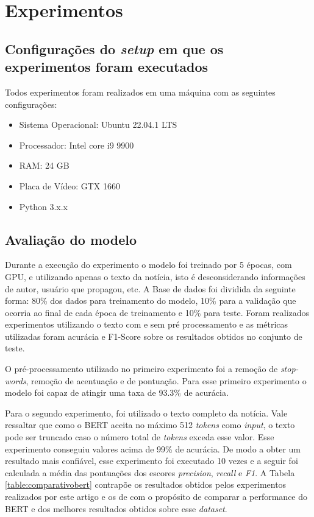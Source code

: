 \section{Experimentos}


\subsection{Configurações do \textit{setup} em que os experimentos foram executados}

Todos experimentos foram realizados em uma máquina com as seguintes configurações: 

\begin{itemize}
    \item Sistema Operacional: Ubuntu 22.04.1 LTS
    \item Processador: Intel core i9 9900
    \item RAM: 24 GB
    \item Placa de Vídeo: GTX 1660
    \item Python 3.x.x
\end{itemize}

\subsection{Avaliação do modelo}

Durante a execução do experimento o modelo foi treinado por 5 épocas, com GPU, e utilizando apenas o texto da notícia, isto é desconsiderando informações de autor, usuário que propagou, etc. A Base de dados foi dividida da seguinte forma: 80\% dos dados para treinamento do modelo, 10\% para a validação que ocorria ao final de cada época de treinamento e 10\% para teste. Foram realizados experimentos utilizando o texto com e sem pré processamento e as métricas utilizadas foram acurácia e F1-Score sobre os resultados obtidos no conjunto de teste.

O pré-processamento utilizado no primeiro experimento foi a remoção de \textit{stop-words}, remoção de acentuação e de pontuação. Para esse primeiro experimento o modelo foi capaz de atingir uma taxa de 93.3\% de acurácia.

Para o segundo experimento, foi utilizado o texto completo da notícia. Vale ressaltar que como o BERT aceita no máximo 512 \textit{tokens} como \textit{input}, o texto pode ser truncado caso o número total de \textit{tokens} exceda esse valor. Esse experimento conseguiu valores acima de 99\% de acurácia. De modo a obter um resultado mais confiável, esse experimento foi executado 10 vezes e a seguir foi calculada a média das pontuações dos escores \textit{precision}, \textit{recall} e \textit{F1}. A Tabela \ref{table:comparativobert} contrapõe os resultados obtidos pelos experimentos realizados por este artigo e os de \citet{Silva2020} com o propósito de comparar a performance do BERT e dos melhores resultados obtidos sobre esse \textit{dataset}.


